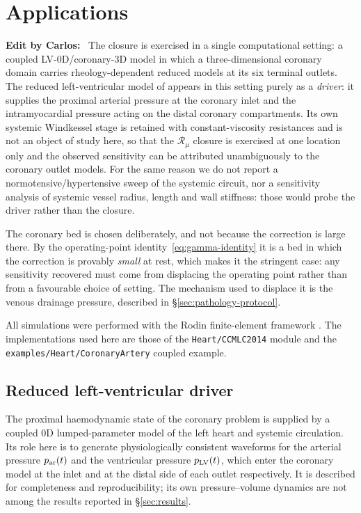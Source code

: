 \documentclass[lineno]{jfm}
\newenvironment{cbpblock}%
  {\par\color{blue}\noindent\textbf{Edit by Carlos:}\ \ignorespaces}%
  {\par}
\begin{document}
\section{Applications}
\label{sec:applications}

\begin{cbpblock}
The closure is exercised in a single computational setting: a coupled
LV-0D/coronary-3D model in which a three-dimensional coronary domain carries
rheology-dependent reduced models at its six terminal outlets. The reduced
left-ventricular model of \citet{caruel2014dimensional} appears in this setting
purely as a \emph{driver}: it supplies the proximal arterial pressure at the
coronary inlet and the intramyocardial pressure acting on the distal coronary
compartments. Its own systemic Windkessel stage is retained with
constant-viscosity resistances and is not an object of study here, so that the
$\mathcal{R}_{\mu}$ closure is exercised at one location only and the observed
sensitivity can be attributed unambiguously to the coronary outlet models. For
the same reason we do not report a normotensive/hypertensive sweep of the
systemic circuit, nor a sensitivity analysis of systemic vessel radius, length
and wall stiffness: those would probe the driver rather than the closure.

The coronary bed is chosen deliberately, and not because the correction is large
there. By the operating-point identity~\eqref{eq:gamma-identity} it is a bed in
which the correction is provably \emph{small} at rest, which makes it the
stringent case: any sensitivity recovered must come from displacing the operating
point rather than from a favourable choice of setting. The mechanism used to
displace it is the venous drainage pressure, described in
\S\ref{sec:pathology-protocol}.

All simulations were performed with the Rodin finite-element framework
\citep{Brito-Pacheco_Rodin_2023}. The implementations used here are those of the
\texttt{Heart/CCMLC2014} module and the
\texttt{examples/Heart/CoronaryArtery} coupled example.
\end{cbpblock}


\subsection{Reduced left-ventricular driver}
\label{sec:ApplicationI}

The proximal haemodynamic state of the coronary problem is supplied by a coupled
0D lumped-parameter model of the left heart and systemic circulation. Its role
here is to generate physiologically consistent waveforms for the arterial
pressure $p_{\rm ar}(t)$ and the ventricular pressure $p_{\rm LV}(t)$, which
enter the coronary model at the inlet and at the distal side of each outlet
respectively. It is described for completeness and reproducibility; its own
pressure--volume dynamics are not among the results reported in
\S\ref{sec:results}.
\end{document}
